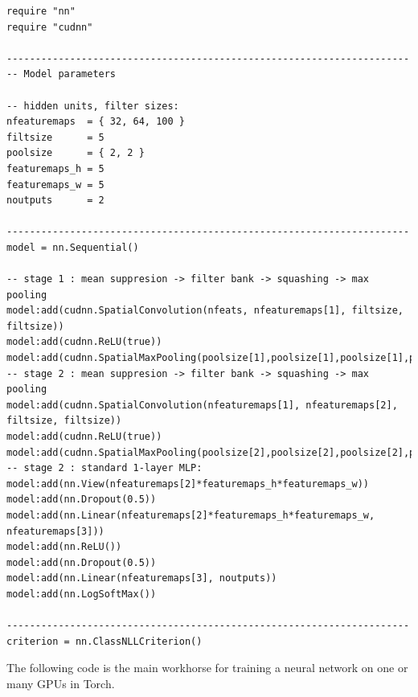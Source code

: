 \begin{lstlisting}
require "nn"
require "cudnn"

----------------------------------------------------------------------
-- Model parameters

-- hidden units, filter sizes:
nfeaturemaps  = { 32, 64, 100 }
filtsize 	  = 5
poolsize 	  = { 2, 2 }
featuremaps_h = 5
featuremaps_w = 5
noutputs 	  = 2

----------------------------------------------------------------------
model = nn.Sequential()

-- stage 1 : mean suppresion -> filter bank -> squashing -> max pooling
model:add(cudnn.SpatialConvolution(nfeats, nfeaturemaps[1], filtsize, filtsize))
model:add(cudnn.ReLU(true))
model:add(cudnn.SpatialMaxPooling(poolsize[1],poolsize[1],poolsize[1],poolsize[1]))
-- stage 2 : mean suppresion -> filter bank -> squashing -> max pooling
model:add(cudnn.SpatialConvolution(nfeaturemaps[1], nfeaturemaps[2], filtsize, filtsize))
model:add(cudnn.ReLU(true))
model:add(cudnn.SpatialMaxPooling(poolsize[2],poolsize[2],poolsize[2],poolsize[2]))
-- stage 2 : standard 1-layer MLP:
model:add(nn.View(nfeaturemaps[2]*featuremaps_h*featuremaps_w))
model:add(nn.Dropout(0.5))
model:add(nn.Linear(nfeaturemaps[2]*featuremaps_h*featuremaps_w, nfeaturemaps[3]))
model:add(nn.ReLU())
model:add(nn.Dropout(0.5))
model:add(nn.Linear(nfeaturemaps[3], noutputs))
model:add(nn.LogSoftMax())

----------------------------------------------------------------------
criterion = nn.ClassNLLCriterion()
\end{lstlisting}

\newpage 

\noindent The following code is the main workhorse for training a neural network on one or many GPUs in Torch.\\

